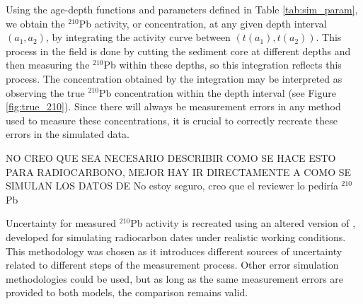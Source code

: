 \documentclass [10pt] {article}
\newcommand{\ac}{\color{red} }  %
\newcommand{\ca}{\color{black}} %
\newcommand{\ma}{\color{blue} }  %
\newcommand{\am}{\color{black}} %
\begin{document}
Using the age-depth functions and parameters defined in Table \ref{tab:sim_param}, we obtain the $^{210}$Pb activity, or concentration, at any given depth interval $(a_1,a_2)$, by integrating the activity curve between $(t(a_1),t(a_2))$.  
This process in the field is done by cutting the sediment core at different depths and then measuring the $^{210}$Pb within these depths, so this integration reflects this process.
The concentration obtained by the integration may be interpreted as observing the true $^{210}$Pb concentration within the depth interval
(see Figure \ref{fig:true_210}).
Since there will always be measurement errors in any method used to measure these concentrations, it is crucial to correctly recreate these errors in the simulated data.

\ac NO CREO QUE SEA NECESARIO DESCRIBIR COMO SE HACE ESTO PARA RADIOCARBONO, MEJOR HAY IR DIRECTAMENTE A COMO SE SIMULAN LOS DATOS DE 
\ma No estoy seguro, creo que el reviewer lo pediría \am
$^{210}$Pb \ca %
 
Uncertainty for measured $^{210}$Pb  activity is recreated using an altered version of \citet{Blaauw2018}, developed for simulating radiocarbon dates under realistic working conditions.
This methodology was chosen as it introduces different sources of uncertainty related to different steps of the measurement process.
Other error simulation methodologies could be used, but as long as the same measurement errors are provided to both models, the comparison remains valid.
\end{document}
